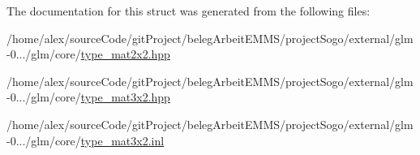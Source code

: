 The documentation for this struct was generated from the following files\-:\begin{DoxyCompactItemize}
\item 
/home/alex/source\-Code/git\-Project/beleg\-Arbeit\-E\-M\-M\-S/project\-Sogo/external/glm-\/0.../glm/core/\hyperlink{type__mat2x2_8hpp}{type\-\_\-mat2x2.\-hpp}\item 
/home/alex/source\-Code/git\-Project/beleg\-Arbeit\-E\-M\-M\-S/project\-Sogo/external/glm-\/0.../glm/core/\hyperlink{type__mat3x2_8hpp}{type\-\_\-mat3x2.\-hpp}\item 
/home/alex/source\-Code/git\-Project/beleg\-Arbeit\-E\-M\-M\-S/project\-Sogo/external/glm-\/0.../glm/core/\hyperlink{type__mat3x2_8inl}{type\-\_\-mat3x2.\-inl}\end{DoxyCompactItemize}
